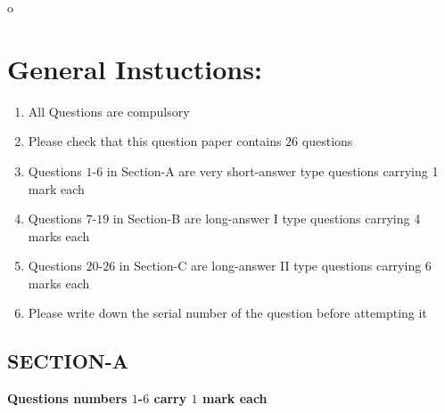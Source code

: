 o\documentclass[a4paper,12pt]{article}
\begin{document}
\section*{\textbf{General Instuctions: }}
\begin{enumerate}[label=(\roman*)]
    \item All Questions are compulsory
    \item Please check that this question paper contains $26$ questions 
    \item Questions $1$-$6$ in Section-A are very short-answer type questions carrying 1 mark each
    \item Questions $7$-$19$ in Section-B are long-answer I type questions carrying 4 marks each
    \item Questions $20$-$26$ in Section-C are long-answer II type questions carrying 6 marks each
    \item Please write down the serial number of the question before attempting it
\end{enumerate}
\begin{center}
	\section*{\large \textbf{SECTION-A}}
	\textbf{Questions numbers $1$-$6$ carry $1$ mark each}
\end{center}
\vspace{1em}
\end{document}
